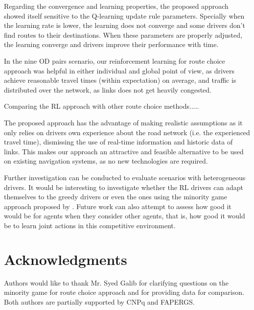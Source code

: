 \documentclass{RITA}
\begin{document}
Regarding the convergence and learning properties, the proposed approach showed itself sensitive to the Q-learning update rule parameters. Specially when the learning rate is lower, the learning does not converge and some drivers don't find routes to their destinations. When these parameters are properly adjusted, the learning converge and drivers improve their performance with time.

In the nine OD pairs scenario, our reinforcement learning for route choice approach was helpful in either individual and global point of view, as drivers achieve reasonable travel times (within expectation) on average, and traffic is distributed over the network, as links does not get heavily congested.

Comparing the RL approach with other route choice methods..... %

The proposed approach has the advantage of making realistic assumptions as it only relies on drivers own experience about the road network (i.e. the experienced travel time), dismissing the use of real-time information and historic data of links. This makes our approach an attractive and feasible alternative to be used on existing navigation systems, as no new technologies are required.

Further investigation can be conducted to evaluate scenarios with heterogeneous drivers. It would be interesting to investigate whether the RL drivers can adapt themselves to the greedy drivers or even the ones using the minority game approach proposed by \cite{Galib&Moser2011}. Future work can also attempt to assess how good it would be for agents when they consider other agents, that is, how good it would be to learn joint actions in this competitive environment.

\section{Acknowledgments}

Authors would like to thank Mr. Syed Galib for clarifying questions on the minority game for route choice approach \cite{Galib&Moser2011} and for providing data for comparison. Both authors are partially supported by CNPq and FAPERGS. %


 
\end{document}
